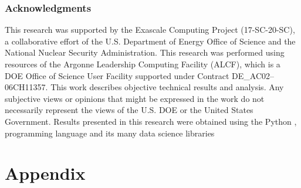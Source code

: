 \documentclass{article} %
\begin{document}
\subsubsection*{Acknowledgments}
This research was supported by the Exascale Computing Project (17-SC-20-SC), a collaborative effort of the U.S.
Department of Energy Office of Science and the National Nuclear Security Administration.
%
This research was performed using resources of the Argonne Leadership Computing Facility (ALCF), which is a DOE Office
of Science User Facility supported under Contract DE\_AC02--06CH11357. 
%
This work describes objective technical results and analysis.
%
Any subjective views or opinions that might be expressed in the work do not necessarily represent the views of the U.S.
DOE or the United States Government.
%
Results presented in this research were obtained using the Python \citep{van1995python}, programming language and its
many data science libraries
\citep{matplotlib,numpyharris2020array,tensorflow2015-whitepaper,seaborn_michael_waskom_2017_883859,ipython4160251,arviz_2019}
%




\appendix
\section{Appendix}
%
\end{document}
